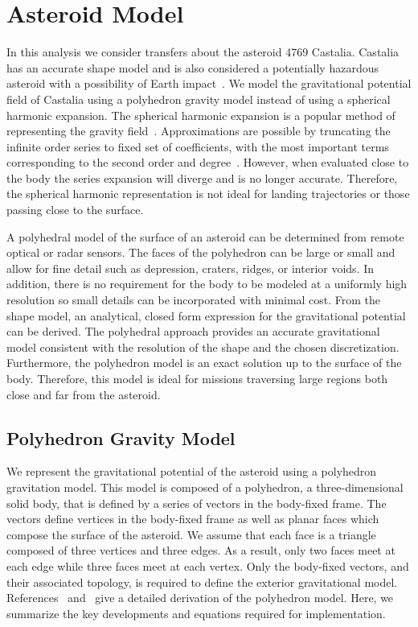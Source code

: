 \documentclass[]{aiaa-tc}%
\begin{document}
\section{Asteroid Model}\label{sec:asteroid_model}

In this analysis we consider transfers about the asteroid 4769 Castalia.
Castalia has an accurate shape model and is also considered a potentially hazardous asteroid with a possibility of Earth impact~\cite{hudson1994}.
We model the gravitational potential field of Castalia using a polyhedron gravity model instead of using a spherical harmonic expansion.
The spherical harmonic expansion is a popular method of representing the gravity field~\cite{scheeres1996}.
Approximations are possible by truncating the infinite order series to fixed set of coefficients, with the most important terms corresponding to the second order and degree~\cite{scheeres1994}. 
However, when evaluated close to the body the series expansion will diverge and is no longer accurate. 
Therefore, the spherical harmonic representation is not ideal for landing trajectories or those passing close to the surface.

A polyhedral model of the surface of an asteroid can be determined from remote optical or radar sensors.
The faces of the polyhedron can be large or small and allow for fine detail such as depression, craters, ridges, or interior voids.
In addition, there is no requirement for the body to be modeled at a uniformly high resolution so small details can be incorporated with minimal cost.
From the shape model, an analytical, closed form expression for the gravitational potential can be derived.
The polyhedral approach provides an accurate gravitational model consistent with the resolution of the shape and the chosen discretization.
Furthermore, the polyhedron model is an exact solution up to the surface of the body.
Therefore, this model is ideal for missions traversing large regions both close and far from the asteroid.

\subsection{Polyhedron Gravity Model}\label{sec:polyhedron_model}

We represent the gravitational potential of the asteroid using a polyhedron gravitation model.
This model is composed of a polyhedron, a three-dimensional solid body, that is defined by a series of vectors in the body-fixed frame.
The vectors define vertices in the body-fixed frame as well as planar faces which compose the surface of the asteroid.
We assume that each face is a triangle composed of three vertices and three edges.
As a result, only two faces meet at each edge while three faces meet at each vertex.
Only the body-fixed vectors, and their associated topology, is required to define the exterior gravitational model.
References~ and~ give a detailed derivation of the polyhedron model.
Here, we summarize the key developments and equations required for implementation.
\end{document}
